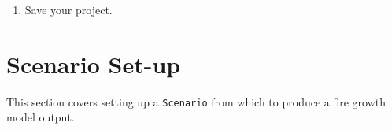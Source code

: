 \documentclass[
  letterpaper,
  DIV=11,
  numbers=noendperiod]{scrreprt}
\providecommand{\tightlist}{%
  \setlength{\itemsep}{0pt}\setlength{\parskip}{0pt}}
\begin{document}
\begin{enumerate}
\begin{enumerate}
\begin{enumerate}
      \begin{enumerate}
      \def\labelenumiv{\arabic{enumiv}.}
      \tightlist
      \item
        To add the \texttt{Line} ignition, left-click on an area of the
        map and then move your cursor to where you want the line segment
        to end. Either double left-click to finalize this line ignition
        or single left-click to start a new segment line.
      \item
        A dialogue box will open. Name the ignition and mind the
        start-time.
      \end{enumerate}
    \item
      \texttt{Polygon} ignition will start your fire growth along the
      \emph{exterior} of the drawn polygon.

      \begin{enumerate}
      \def\labelenumiv{\arabic{enumiv}.}
      \tightlist
      \item
        Similar to the \texttt{Line} ignition above but you will need to
        finalize the connection of your last segment to the starting
        segment to create the polygon.
      \item
        Name the ignition and mind the start-time.
      \end{enumerate}
    \end{enumerate}
  \end{enumerate}
\item
  Save your project.
\end{enumerate}

\section{Scenario Set-up}\label{scenario-set-up}

This section covers setting up a \texttt{Scenario} from which to produce
a fire growth model output.
\end{document}
